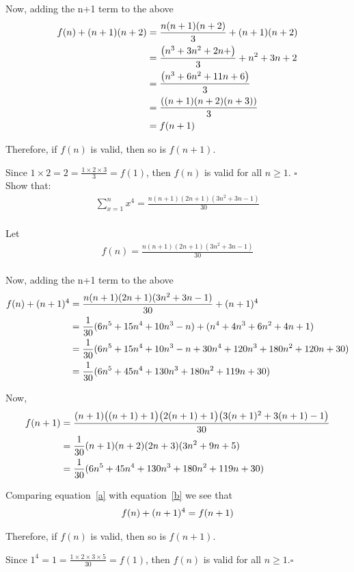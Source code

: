 \documentclass[a4paper,12pt]{article}
\begin{document}
\begin{question}
Now, adding the n+1 term to the above
\begin{gather}\notag
\begin{aligned}
	f(n)+(n+1)(n+2)&=\frac{n(n+1)(n+2)}{3}+(n+1)(n+2)\\
	&=\frac{\left(n^3+3n^2+2n+\right)}{3}+n^2+3n+2\\
	&=\frac{\left(n^3+6n^2+11n+6\right)}{3}\\
	&=\frac{\left((n+1)(n+2)(n+3)\right)}{3}\\
	&=f(n+1)
\end{aligned}
\end{gather}

Therefore, if $f(n)$ is valid, then so is $f(n+1)$.

Since $1\times2=2=\frac{1\times2\times3}{3}=f(1)$, then $f(n)$ is valid for all $n\geq1$. \hfill $\square$\\[1cm]

\qsubpart
Show that:
\begin{gather*}
	 \sum_{x=1}^{n}x^4=\frac{n(n+1)(2n+1)(3n^2+3n-1)}{30}\\
\end{gather*}


Let
\begin{gather*}
	f(n)=\frac{n(n+1)(2n+1)(3n^2+3n-1)}{30}\\
\end{gather*}

Now, adding the n+1 term to the above
\begin{align}
	f(n)+(n+1)^4&=\frac{n(n+1)(2n+1)(3n^2+3n-1)}{30}+(n+1)^4\notag \\
	&=\frac{1}{30}(6n^5+15n^4+10n^3-n)+(n^4+4n^3+6n^2+4n+1)\notag \\
	&=\frac{1}{30}(6n^5+15n^4+10n^3-n+30n^4+120n^3+180n^2+120n+30)\notag \\
	&=\frac{1}{30}(6n^5+45n^4+130n^3+180n^2+119n+30)\label{a}
\end{align}

Now,
\begin{align}
	f(n+1)&=\frac{(n+1)\big((n+1)+1\big)\big(2(n+1)+1\big)\big(3(n+1)^2+3(n+1)-1\big)}{30}\notag \\
	&=\frac{1}{30}(n+1)(n+2)(2n+3)(3n^2+9n+5)\notag \\
	&=\frac{1}{30}(6n^5+45n^4+130n^3+180n^2+119n+30)\label{b}
\end{align}

Comparing equation~\eqref{a} with equation~\eqref{b} we see that
\begin{gather}\notag
f(n)+(n+1)^4=f(n+1)
\end{gather}

Therefore, if $f(n)$ is valid, then so is $f(n+1)$.

Since $1^4=1=\frac{1\times2\times3\times5}{30}=f(1)$, then $f(n)$ is valid for all $n\geq1$.\hfill $\square$

\end{question}
\end{document}
